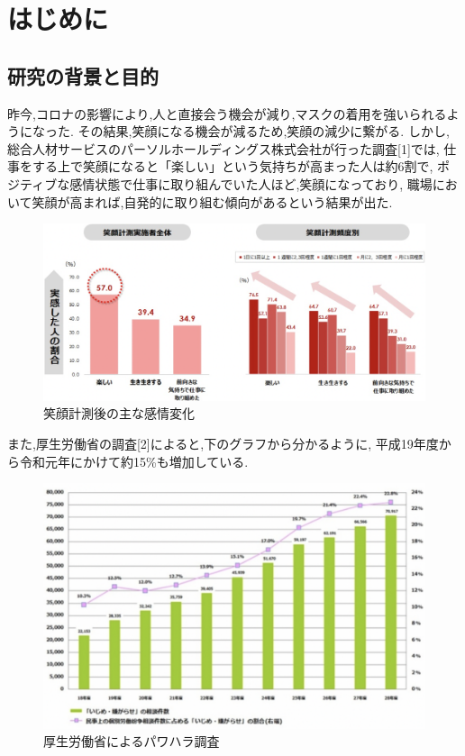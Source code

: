 \chapter{はじめに}
\label {chp:tex_basic}

\section{研究の背景と目的}
\label{sec:tex_basic_section}
昨今,コロナの影響により,人と直接会う機会が減り,マスクの着用を強いられるようになった.
その結果,笑顔になる機会が減るため,笑顔の減少に繋がる.
しかし,総合人材サービスのパーソルホールディングス株式会社が行った調査[1]では,
仕事をする上で笑顔になると「楽しい」という気持ちが高まった人は約6割で,
ポジティブな感情状態で仕事に取り組んでいた人ほど,笑顔になっており,
職場において笑顔が高まれば,自発的に取り組む傾向があるという結果が出た.

\begin{figure}[!h]
    \begin{center}
        \includegraphics[scale=0.5, clip]{./img/work.png}
        \caption{笑顔計測後の主な感情変化}
        \label{fig:図の名前}
    \end{center}
\end{figure}

また,厚生労働省の調査[2]によると,下のグラフから分かるように,
平成19年度から令和元年にかけて約15\%も増加している.
\clearpage

\begin{figure}[!h]
    \begin{center}
        \includegraphics[scale=0.6, clip]{./img/graph.png}
        \caption{厚生労働省によるパワハラ調査}
        \label{fig:図の名前}
    \end{center}
\end{figure}

